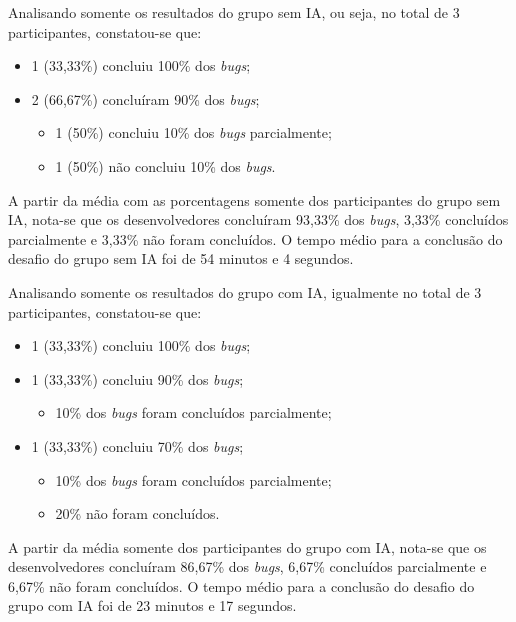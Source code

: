 \documentclass[english,brazilian]{UNISINOSartigo} %
\begin{document}
Analisando somente os resultados do grupo sem IA, ou seja, no total de 3 participantes, constatou-se que:

\begin{itemize}[leftmargin=1cm, itemsep=0.1em, topsep=0.1em]
    \item 1 (33,33\%) concluiu 100\% dos \textit{bugs};
    \item 2 (66,67\%) concluíram 90\% dos \textit{bugs};
    \begin{itemize}[leftmargin=1.2cm, itemsep=0.1em, topsep=0.1em]
        \item 1 (50\%) concluiu 10\% dos \textit{bugs} parcialmente;
        \item 1 (50\%) não concluiu 10\% dos \textit{bugs}.
    \end{itemize}
\end{itemize}

A partir da média com as porcentagens somente dos participantes do grupo sem IA, nota-se que os desenvolvedores concluíram 93,33\% dos \textit{bugs}, 3,33\% concluídos parcialmente e 3,33\% não foram concluídos. O tempo médio para a conclusão do desafio do grupo sem IA foi de 54 minutos e 4 segundos.

Analisando somente os resultados do grupo com IA, igualmente no total de 3 participantes, constatou-se que:

\begin{itemize}[leftmargin=1cm, itemsep=0.1em, topsep=0.1em]
    \item 1 (33,33\%) concluiu 100\% dos \textit{bugs};
    \item 1 (33,33\%) concluiu 90\% dos \textit{bugs};
    \begin{itemize}[leftmargin=1.2cm, itemsep=0.1em, topsep=0.1em]
        \item 10\% dos \textit{bugs} foram concluídos parcialmente;
    \end{itemize}
    \item 1 (33,33\%) concluiu 70\% dos \textit{bugs};
    \begin{itemize}[leftmargin=1.2cm, itemsep=0.1em, topsep=0.1em]
        \item 10\% dos \textit{bugs} foram concluídos parcialmente;
        \item 20\% não foram concluídos.
    \end{itemize}
\end{itemize}

A partir da média somente dos participantes do grupo com IA, nota-se que os desenvolvedores concluíram 86,67\% dos \textit{bugs}, 6,67\% concluídos parcialmente e 6,67\% não foram concluídos. O tempo médio para a conclusão do desafio do grupo com IA foi de 23 minutos e 17 segundos.
\end{document}
